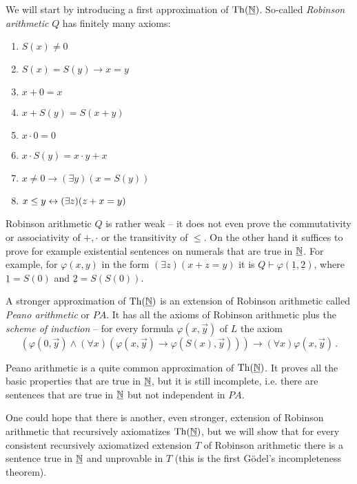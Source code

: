 We will start by introducing a first approximation of $\operatorname{Th}(\underline{\mathbb{N}})$. So-called \emph{Robinson arithmetic} $Q$ has finitely many axioms:
\begin{multicols}{2}
\begin{enumerate}
  \item $S(x) \neq 0$
  \item $S(x) = S(y) \to x = y$
  \item $x + 0 = x$
  \item $x + S(y) = S(x+y)$
  \columnbreak
  \item $x \cdot 0 = 0$
  \item $x \cdot S(y) = x \cdot y + x$
  \item $x \neq 0 \to (\exists y)(x = S(y))$
  \item $x \leq y \leftrightarrow (\exists z)(z +x = y)$
\end{enumerate}
\end{multicols}

Robinson arithmetic $Q$ is rather weak -- it does not even prove the commutativity or associativity of $+,\cdot$ or the transitivity of $\leq$. On the other hand it suffices to prove for example existential sentences on numerals that are true in $\underline{\mathbb{N}}$. For example, for $\varphi(x,y)$ in the form $(\exists z)(x+z=y)$ it is $Q \vdash \varphi(\underline{1}, \underline{2})$, where $\underline{1} = S(0)$ and $\underline{2} = S(S(0))$.

A stronger approximation of $\operatorname{Th}(\underline{\mathbb{N}})$ is an extension of Robinson arithmetic called \emph{Peano arithmetic} or $PA$. It has all the axioms of Robinson arithmetic plus the \emph{scheme of induction} -- for every formula $\varphi(x, \vec{y})$ of $L$ the axiom $$(\varphi(0, \vec{y}) \land (\forall x)(\varphi(x, \vec{y}) \to \varphi(S(x), \vec{y}))) \to (\forall x)\varphi(x, \vec{y})\,.$$

Peano arithmetic is a quite common approximation of $\operatorname{Th}(\underline{\mathbb{N}})$. It proves all the basic properties that are true in $\underline{\mathbb{N}}$, but it is still incomplete, i.e. there are sentences that are true in $\underline{\mathbb{N}}$ but not independent in $PA$. 

One could hope that there is another, even stronger, extension of Robinson arithmetic that recursively axiomatizes $\operatorname{Th}(\underline{\mathbb{N}})$, but we will show that for every consistent recursively axiomatized extension $T$ of Robinson arithmetic there is a sentence true in $\underline{\mathbb{N}}$ and unprovable in $T$ (this is the first Gödel's incompleteness theorem).

